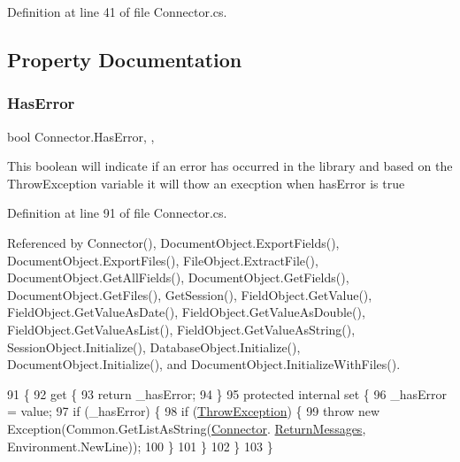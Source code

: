Definition at line 41 of file Connector.\+cs.



\subsection{Property Documentation}
\mbox{\label{class_connector_a9365777a6b7b711b75bcfa6c4d53e989}} 
\subsubsection{\texorpdfstring{Has\+Error}{HasError}}
{\footnotesize\ttfamily bool Connector.\+Has\+Error\hspace{0.3cm}{\ttfamily [static]}, {\ttfamily [get]}, {\ttfamily [set]}}



This boolean will indicate if an error has occurred in the library and based on the Throw\+Exception variable it will thow an execption when has\+Error is true 



Definition at line 91 of file Connector.\+cs.



Referenced by Connector(), Document\+Object.\+Export\+Fields(), Document\+Object.\+Export\+Files(), File\+Object.\+Extract\+File(), Document\+Object.\+Get\+All\+Fields(), Document\+Object.\+Get\+Fields(), Document\+Object.\+Get\+Files(), Get\+Session(), Field\+Object.\+Get\+Value(), Field\+Object.\+Get\+Value\+As\+Date(), Field\+Object.\+Get\+Value\+As\+Double(), Field\+Object.\+Get\+Value\+As\+List(), Field\+Object.\+Get\+Value\+As\+String(), Session\+Object.\+Initialize(), Database\+Object.\+Initialize(), Document\+Object.\+Initialize(), and Document\+Object.\+Initialize\+With\+Files().


\begin{DoxyCode}
91                                 \{
92         \textcolor{keyword}{get} \{
93             \textcolor{keywordflow}{return} \_hasError;
94         \}
95         \textcolor{keyword}{protected} \textcolor{keyword}{internal} \textcolor{keyword}{set} \{
96             \_hasError = value;
97             \textcolor{keywordflow}{if} (\_hasError) \{
98                 \textcolor{keywordflow}{if} (\mbox{\hyperlink{class_connector_a8ec0dcdbb4a85a56fa50f67686484c19}{ThrowException}}) \{
99                     \textcolor{keywordflow}{throw} \textcolor{keyword}{new} Exception(Common.GetListAsString(\mbox{\hyperlink{class_connector}{Connector}}.
      \mbox{\hyperlink{class_connector_a1ed422674b344524fd77998dcf6a9ba6}{ReturnMessages}}, Environment.NewLine));
100                 \}
101             \}
102         \}
103     \}
\end{DoxyCode}
\mbox{\label{class_connector_a7e4bd5a6b59b228b169066b5f5ed4b0a}} 
